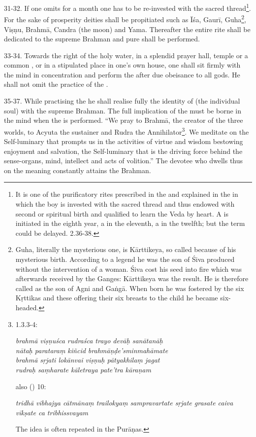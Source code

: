 31-32. If one omits  for a month one has to be re-invested with
the sacred thread\footnote{It is one of the purificatory rites prescribed in
the  and explained in the  in which the boy
is invested with the sacred thread and thus endowed with second or spiritual
birth and qualified to learn the Veda by heart. A  is initiated in
the eighth year, a  in the eleventh, a  in the twelfth;
but the term could be delayed.  2.36-38.}. For
the sake of prosperity deities shall be propitiated such as Īśa, Gaurī,
Guha\footnote{Guha, literally the mysterious one, is Kārttikeya, so called
because of his mysterious birth. According to a legend he was the son of Śiva
produced without the intervention of a woman. Śiva cost his seed into fire which
was afterwards received by the Ganges: Kārttikeya was the result. He is
therefore called as the son of Agni and Gaṅgā. When born he was fostered by
the six Kṛttikas and these offering their six breasts to the child he became
six-headed.}, Viṣṇu, Brahmā, Candra (the moon) and Yama. Thereafter the entire
rite shall be dedicated to the supreme Brahman and pure  shall be
performed.

33-34. Towards the right of the holy water, in a splendid prayer hall, temple or
a common , or in a stipulated place in one’s own house, one shall sit
firmly with the mind in concentration and perform the  after
due obeisance to all gods. He shall not omit the practice of the .

35-37. While practising the  he shall realise fully the identity of
 (the individual soul) with the supreme Brahman. The full implication
of the  must be borne in the mind when the  is performed.
“We pray to Brahmā, the creator of the three worlds, to Acyuta the sustainer and
Rudra the Annihilator\footnote{ 1.3.3-4:

\begin{shloka}\itshape
brahmā viṣṇuśca rudraśca trayo devāḥ sanātanāḥ\\
nātaḥ parataraṃ kiñcid brahmāṇḍe'sminmahāmate\\
brahmā sṛjati lokānvai viṣṇuḥ pātyakhilaṃ jagat\\
rudraḥ saṃharate kāletraya pate'tra kāraṇam
\end{shloka}

also  () 10:

\begin{shloka}\itshape
tridhā vibhajya cātmānaṃ trailokyaṃ sampravartate
sṛjate grasate caiva vīkṣate ca tribhissvayam
\end{shloka}

The idea is often repeated in the Purāṇas.}. We meditate on the Self-luminary
that prompts us in the activities of virtue and wisdom bestowing enjoyment and
salvation, the Self-luminary that is the driving force behind the sense-organs,
mind, intellect and acts of volition.” The devotee who dwells thus on
the meaning constantly attains the Brahman.

